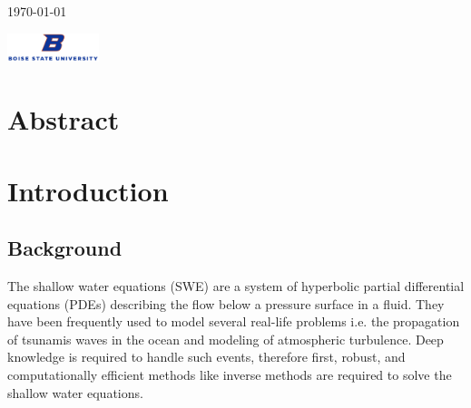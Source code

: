 \documentclass[12pt,a4paper]{article}
\begin{document}
\begin{titlepage}
		
		
		\vfill\vfill\vfill %
		
		{\large\today} %
		
		
		\includegraphics[width=0.2\textwidth]{"Screenshot 2021-03-19 at 10.18.39 PM"}\\[1cm] %

		
		\vfill %
		
	\end{titlepage}
	
	\section*{Abstract}
	\tableofcontents
	\newpage
	\section{Introduction}
	\subsection{Background}
	The shallow water  equations (SWE) are a system of hyperbolic partial differential equations (PDEs) describing the flow below a pressure surface in a fluid. They have been frequently used to model several real-life problems i.e. the propagation of tsunamis waves in the ocean \citep{dias2007dynamics} and modeling of atmospheric turbulence. Deep knowledge is required to handle such events, therefore first, robust, and computationally efficient methods like inverse methods are required to solve the shallow water equations.
	
\end{document}
